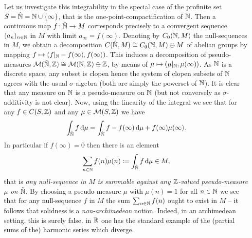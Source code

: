 \begin{remark}
	Let us investigate this integrability in the special case of the profinite set $S = \hat{{\mathbb{N}}}={\mathbb{N}}\cup\{\infty\}$, that is the one-point-compactification of ${\mathbb{N}}$. Then a continuous map $f\colon \hat {{\mathbb{N}}}\to M$ corresponds precisely to a convergent sequence $(a_n)_{n\in {\mathbb{N}}}$ in $M$ with limit $a_\infty = f(\infty)$. Denoting by ${C_0({\mathbb{N}}, M)}$ the null-sequences in $M$, we obtain a decomposition ${C(\hat {{\mathbb{N}}}, M)} \cong {C_0({\mathbb{N}}, M)} \oplus M$ of abelian groups by mapping $f\mapsto (f\vert_{\mathbb{N}}-f(\infty), f(\infty))$. This induces a decomposition of pseudo-measures ${\mathcal{M}(\hat{{\mathbb{N}}}, {\mathbb{Z}})} \cong {\mathcal{M}({\mathbb{N}}, {\mathbb{Z}})}\oplus {\mathbb{Z}}$, by means of $\mu\mapsto (\mu\vert_{\mathbb{N}}, \mu(\infty))$. As ${\mathbb{N}}$ is a discrete space, any subset is clopen hence the system of clopen subsets of ${\mathbb{N}}$ agrees with the usual $\sigma$-algebra (both are simply the powerset of ${\mathbb{N}}$). It is clear that any measure on ${\mathbb{N}}$ is a pseudo-measure on ${\mathbb{N}}$ (but not conversely as $\sigma$-additivity is not clear). Now, using the linearity of the integral we see that for any $f\in {C(S, {\mathbb{Z}})}$ and any $\mu \in {\mathcal{M}(S, {\mathbb{Z}})}$ we have
		$$\int_{\hat {{\mathbb{N}}}} f \,\mathrm{d}\mu = \int_{\hat {{\mathbb{N}}}} f-f(\infty) \,\mathrm{d}\mu + f(\infty)\mu(\infty).$$
	In particular if $f(\infty) = 0$ then there is an element
		$$\sum_{n\in {\mathbb{N}}} f(n) \mu(n) \coloneqq \int_{\hat{{\mathbb{N}}}} f\,\mathrm{d}\mu \in M,$$
	that is \emph{any null-sequence in $M$ is summable against any ${\mathbb{Z}}$-valued pseudo-measure $\mu$ on $\hat {{\mathbb{N}}}$}. By choosing a pseudo-measure $\mu$ with $\mu(n)=1$ for all $n\in {\mathbb{N}}$ we see that for any null-sequence $f$ in $M$ the sum $\sum_{n\in {\mathbb{N}}} f(n)$ ought to exist in $M$ -- it follows that solidness is a \emph{non-archimedean} notion. Indeed, in an archimedean setting, this is surely false. \Eg in ${\mathbb{R}}$ one has the standard example of the (partial sums of the) harmonic series which diverge.
\end{remark}

